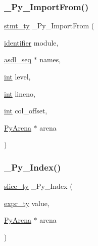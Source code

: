 \mbox{\label{_python-ast_8h_a78ee6afb979ce2e9d7c57aface1dc7f4}} 
\subsubsection{\texorpdfstring{\_Py\_ImportFrom()}{\_Py\_ImportFrom()}}
{\footnotesize\ttfamily \mbox{\hyperlink{_python-ast_8h_a39618071027b661bc03e8916e664e1a7}{stmt\+\_\+ty}} \+\_\+\+Py\+\_\+\+Import\+From (\begin{DoxyParamCaption}\item[{\mbox{\hyperlink{asdl_8h_a78ca2081e230a95abc88c411c9816775}{identifier}}}]{module,  }\item[{\mbox{\hyperlink{structasdl__seq}{asdl\+\_\+seq}} $\ast$}]{names,  }\item[{\mbox{\hyperlink{warnings_8h_a74f207b5aa4ba51c3a2ad59b219a423b}{int}}}]{level,  }\item[{\mbox{\hyperlink{warnings_8h_a74f207b5aa4ba51c3a2ad59b219a423b}{int}}}]{lineno,  }\item[{\mbox{\hyperlink{warnings_8h_a74f207b5aa4ba51c3a2ad59b219a423b}{int}}}]{col\+\_\+offset,  }\item[{\mbox{\hyperlink{pyarena_8h_a9edeb357fbb27333471022a0975adb7a}{Py\+Arena}} $\ast$}]{arena }\end{DoxyParamCaption})}

\mbox{\label{_python-ast_8h_a9aac09e16c4da5fdfa59d726fa0e1e2c}} 
\subsubsection{\texorpdfstring{\_Py\_Index()}{\_Py\_Index()}}
{\footnotesize\ttfamily \mbox{\hyperlink{_python-ast_8h_a1aba5288236679e8faff34c189476bf0}{slice\+\_\+ty}} \+\_\+\+Py\+\_\+\+Index (\begin{DoxyParamCaption}\item[{\mbox{\hyperlink{_python-ast_8h_a56d3705e020a071405094a220c4592bd}{expr\+\_\+ty}}}]{value,  }\item[{\mbox{\hyperlink{pyarena_8h_a9edeb357fbb27333471022a0975adb7a}{Py\+Arena}} $\ast$}]{arena }\end{DoxyParamCaption})}

